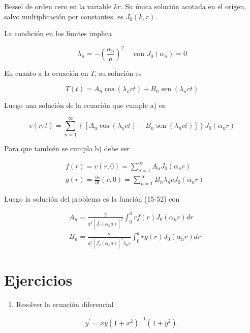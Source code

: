 \documentclass[10pt]{article}
\theoremstyle{plain}
\theoremstyle{definition}
\theoremstyle{remark}
\begin{document}
Bessel de orden cero en la variable $k r$. Su única solución acotada en el origen, salvo multiplicación por constantes, es $J_{0}(k, r)$.

La condición en los límites implica

$$
\lambda_{n}=-\left(\frac{\alpha_{n}}{a}\right)^{2} \quad \text { con } J_{0}\left(\alpha_{n}\right)=0
$$

En cuanto a la ecuación en $T$, su solución es

$$
T(t)=A_{n} \cos \left(\lambda_{n} c t\right)+B_{n} \operatorname{sen}\left(\lambda_{n} c t\right)
$$

Luego una solución de la ecuación que cumple a) es


\begin{equation*}
v(r, t)=\sum_{n=1}^{\infty}\left\{\left[A_{n} \cos \left(\lambda_{n} c t\right)+B_{n} \operatorname{sen}\left(\lambda_{n} c t\right)\right]\right\} J_{0}\left(\alpha_{n} r\right) \tag{15-52}
\end{equation*}


Para que también se cumpla b) debe ser

$$
\begin{aligned}
& f(r)=v(r, 0)=\sum_{n=1}^{\infty} A_{n} J_{0}\left(\alpha_{n} r\right) \\
& g(r)=\frac{\partial v}{\partial t}(r, 0)=\sum_{n=1}^{\infty} B_{n} \lambda_{n} c J_{0}\left(\alpha_{n} r\right)
\end{aligned}
$$

Luego la solución del problema es la función (15-52) con

$$
\begin{aligned}
& A_{n}=\frac{2}{a^{2}\left[J_{0}^{\prime}\left(\alpha_{n} a\right)\right]^{2}} \int_{0}^{a} r f(r) J_{0}\left(\alpha_{n} r\right) d r \\
& B_{n}=\frac{2}{a^{2}\left[J_{0}^{\prime}\left(\alpha_{n} a\right)\right]^{2} \lambda_{n} c} \int_{0}^{a} r g(r) J_{0}\left(\alpha_{n} r\right) d r
\end{aligned}
$$

\section*{Ejercicios}
\begin{enumerate}
  \item Resolver la ecuación diferencial
\end{enumerate}

$$
y^{\prime}=x y\left(1+x^{2}\right)^{-1}\left(1+y^{2}\right) .
$$
\end{document}
